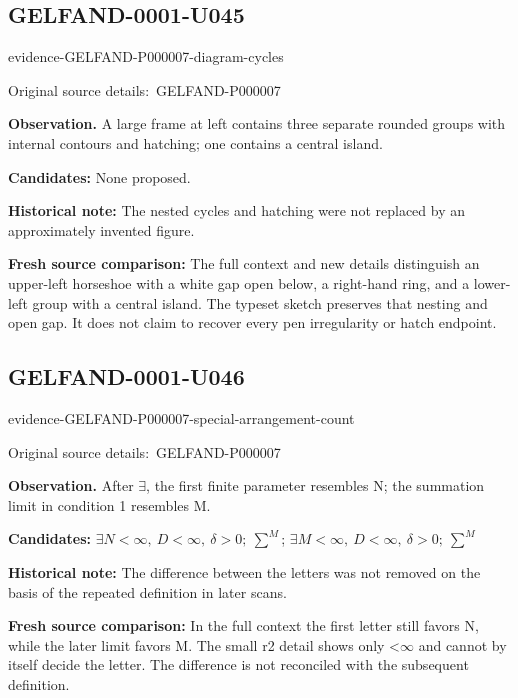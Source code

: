 \documentclass[11pt]{article}
\newcommand{\EvidenceBlock}[4]{%
 \par\smallskip\noindent\begin{minipage}{\linewidth}
 \begin{minipage}[t]{.47\linewidth}\vspace{0pt}\centering
 \csname evidence-#1-#2\endcsname\par
 {\scriptsize\SourceCropCaption\ #1}\par
 \end{minipage}\hfill
 \begin{minipage}[t]{.49\linewidth}\vspace{0pt}\raggedright
 {\small\color{orange!65!black}\textbf{#4} #3}\par
 \end{minipage}
 \end{minipage}\par\smallskip}
\newcommand{\SourceCropCaption}{Original source details:}\newcommand{\ReadingCaption}{Uncertain reading.}\newcommand{\IncompleteCaption}{Undeciphered passage.}\newcommand{\DiagramCaption}{Diagram and typed description.}
\begin{document}
\subsection*{GELFAND-0001-U045}
\EvidenceBlock{GELFAND-P000007}{diagram-cycles}{A large frame at left contains three separate rounded groups with internal contours and hatching; one contains a central island.}{Observation.}
\par\smallskip\noindent\textbf{Candidates: } None proposed.\par
\par\smallskip\noindent\textbf{Historical note: } The nested cycles and hatching were not replaced by an approximately invented figure.\par
\par\smallskip\noindent\textbf{Fresh source comparison: } The full context and new details distinguish an upper-left horseshoe with a white gap open below, a right-hand ring, and a lower-left group with a central island. The typeset sketch preserves that nesting and open gap. It does not claim to recover every pen irregularity or hatch endpoint.\par

\subsection*{GELFAND-0001-U046}
\EvidenceBlock{GELFAND-P000007}{special-arrangement-count}{After \(\exists\), the first finite parameter resembles N; the summation limit in condition 1 resembles M.}{Observation.}
\par\smallskip\noindent\textbf{Candidates: } \(\exists N<\infty,\ D<\infty,\ \delta>0;\ \sum^{M}\); \(\exists M<\infty,\ D<\infty,\ \delta>0;\ \sum^{M}\)\par
\par\smallskip\noindent\textbf{Historical note: } The difference between the letters was not removed on the basis of the repeated definition in later scans.\par
\par\smallskip\noindent\textbf{Fresh source comparison: } In the full context the first letter still favors N, while the later limit favors M. The small r2 detail shows only <\(\infty\) and cannot by itself decide the letter. The difference is not reconciled with the subsequent definition.\par
\end{document}
